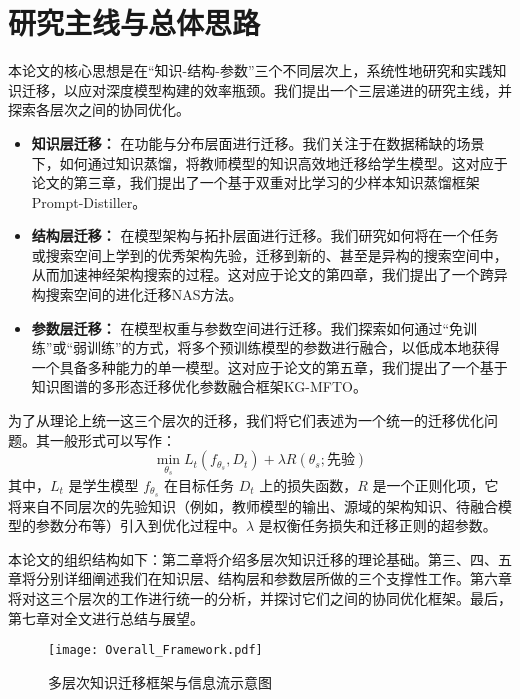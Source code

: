 \section[\hspace{-2pt}研究主线与总体思路]{{\heiti{} \hspace{-8pt}研究主线与总体思路}}
\label{sec:intro-outline}

本论文的核心思想是在“知识-结构-参数”三个不同层次上，系统性地研究和实践知识迁移，以应对深度模型构建的效率瓶颈。我们提出一个三层递进的研究主线，并探索各层次之间的协同优化。

\begin{itemize}
	\item \textbf{知识层迁移：} 在功能与分布层面进行迁移。我们关注于在数据稀缺的场景下，如何通过知识蒸馏，将教师模型的知识高效地迁移给学生模型。这对应于论文的第三章，我们提出了一个基于双重对比学习的少样本知识蒸馏框架Prompt-Distiller。
	\item \textbf{结构层迁移：} 在模型架构与拓扑层面进行迁移。我们研究如何将在一个任务或搜索空间上学到的优秀架构先验，迁移到新的、甚至是异构的搜索空间中，从而加速神经架构搜索的过程。这对应于论文的第四章，我们提出了一个跨异构搜索空间的进化迁移NAS方法。
	\item \textbf{参数层迁移：} 在模型权重与参数空间进行迁移。我们探索如何通过“免训练”或“弱训练”的方式，将多个预训练模型的参数进行融合，以低成本地获得一个具备多种能力的单一模型。这对应于论文的第五章，我们提出了一个基于知识图谱的多形态迁移优化参数融合框架KG-MFTO。
\end{itemize}

为了从理论上统一这三个层次的迁移，我们将它们表述为一个统一的迁移优化问题。其一般形式可以写作：
$$ \min_{\theta_s} L_t(f_{\theta_s}, D_t) + \lambda R(\theta_s; \text{先验}) $$
其中，$L_t$ 是学生模型 $f_{\theta_s}$ 在目标任务 $D_t$ 上的损失函数，$R$ 是一个正则化项，它将来自不同层次的先验知识（例如，教师模型的输出、源域的架构知识、待融合模型的参数分布等）引入到优化过程中。$\lambda$ 是权衡任务损失和迁移正则的超参数。

本论文的组织结构如下：第二章将介绍多层次知识迁移的理论基础。第三、四、五章将分别详细阐述我们在知识层、结构层和参数层所做的三个支撑性工作。第六章将对这三个层次的工作进行统一的分析，并探讨它们之间的协同优化框架。最后，第七章对全文进行总结与展望。

\begin{figure}[htbp]
	\centering
	\texttt{[image: Overall\_Framework.pdf]}
	\caption{多层次知识迁移框架与信息流示意图}
	\label{fig:Overall_Framework}
\end{figure}
